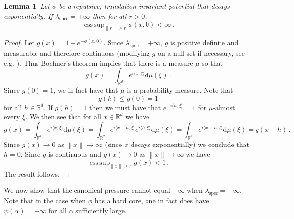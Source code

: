 \documentclass[10pt]{amsart}
\newtheorem{lemma}[theorem]{Lemma}
\theoremstyle{definition}
\theoremstyle{remark}
\DeclareMathOperator*{\esssup}{ess\,sup}
\newcommand{\spec}{{\mathrm{spec}}}
\newcommand{\R}{\mathbb{R}}
\newcommand{\diff}{\mathrm{d}}
\newcommand{\norm}[1]{\left\lVert#1\right\rVert}
\begin{document}
	\begin{lemma}\label{lem:impossible-core}
		Let $\phi$ be a repulsive, translation invariant potential that decays exponentially. If $\lambda_\spec=+\infty$ then for all $r>0$,
		\[
		\esssup_{\|x\|\ge r}\phi(x,0)<\infty\, .
		\]
	\end{lemma}
	\begin{proof}
		Let $g(x)=1-e^{-\phi(x,0)}$.
		Since $\lambda_\spec=+\infty$, $g$ is positive definite and measurable and therefore continuous (modifying $g$ on a null set if necessary, see e.g. \cite[Theorem 3.10.20, page 221]{bogachev2007measure}). Thus Bochner's theorem implies that there is a measure $\mu$ so that $$g(x) = \int_{\R^d} e^{i \langle x, \xi\rangle} \diff\mu(\xi)\,.$$ Since $g(0) = 1$, we in fact have that $\mu$ is a probability measure. Note that
		\[
		g(h)\leq g(0)=1
		\]
		for all $h\in \R^d$. If $g(h)=1$ then we must have that $e^{-i\langle h, \xi \rangle}  = 1$ for $\mu$-almost every $\xi$.  We then see that for all $x \in \R^d$  we have $$g(x) = \int_{\R^d} e^{i\langle x, \xi\rangle} \diff\mu(\xi) =  \int_{\R^d} e^{i\langle x - h, \xi\rangle} e^{i\langle h, \xi\rangle}\diff\mu(\xi) =  \int_{\R^d} e^{i\langle x - h, \xi\rangle}\diff\mu(\xi) = g(x - h)\, .$$
		Since $g(x)\to0$ as $\norm{x}\to\infty$ (since $\phi$ decays exponentially) we conclude that $h=0$. Since $g$ is continuous and $g(x)\to0$ as $\norm{x}\to\infty$ we have
		\[
		\esssup_{\|x\|\ge r}g(x)<1\, .
		\]
		The result follows. 
	\end{proof}
	
	We now show that the canonical pressure cannot equal $-\infty$ when $\lambda_{\spec} = +\infty$.  Note that in the case when $\phi$ has a hard core, one in fact does have $\psi(\alpha) = -\infty$ for all $\alpha$ sufficiently large.
	
\end{document}
